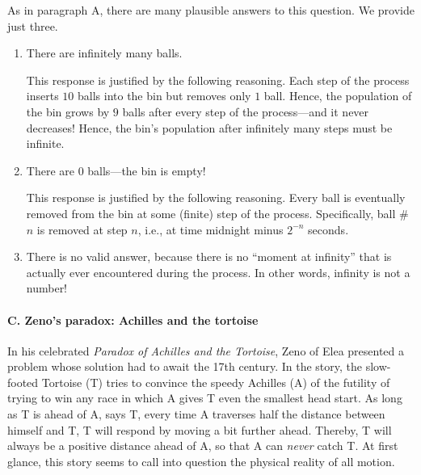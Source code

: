 \noindent
As in paragraph {\small\sf A}, there are many plausible answers to
this question.  We provide just three.
\begin{enumerate}
\item
There are infinitely many balls.

This response is justified by the following reasoning.  Each step of
the process inserts $10$ balls into the bin but removes only $1$ ball.
Hence, the population of the bin grows by $9$ balls after every step
of the process---and it never decreases!  Hence, the bin's population
after infinitely many steps must be infinite.

\item
There are $0$ balls---the bin is empty!

This response is justified by the following reasoning.  Every ball is
eventually removed from the bin at some (finite) step of the process.
Specifically, ball \#$n$ is removed at step $n$, i.e., at time
midnight minus $2^{-n}$ seconds.

\item
There is no valid answer, because there is no ``moment at infinity''
that is actually ever encountered during the process.
In other words, infinity is not a number!
\end{enumerate}


\paragraph{C.  Zeno's paradox: Achilles and the tortoise}

In his celebrated {\it Paradox of Achilles and the Tortoise}, Zeno of
Elea   presented a
problem whose solution had to await the 17th century.  In the story,
the slow-footed Tortoise (T) tries to convince the speedy Achilles (A)
of the futility of trying to win any race in which A gives T even the
smallest head start.  As long as T is ahead of A, says T, every time A
traverses half the distance between himself and T, T will respond by
moving a bit further ahead.  Thereby, T will always be a positive
distance ahead of A, so that A can {\em never} catch T.  At first
glance, this story seems to call into question the physical reality of
all motion.

